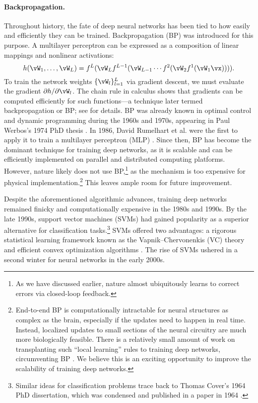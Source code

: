 \documentclass[../../book-main.tex]{subfiles}
\begin{document}
\paragraph{Backpropagation.}
Throughout history, the fate of deep neural networks has been tied to how easily and efficiently they can be trained. Backpropagation (BP) was introduced for this purpose. A multilayer perceptron can be expressed as a composition of linear mappings and nonlinear activations:
\begin{equation}
    h(\vW_{1}, \ldots, \vW_{L}) = f^{L}(\vW_{L}f^{L-1}(\vW_{L-1} \cdots f^{2}(\vW_{2}f^{1}(\vW_{1}\vx)))).
\end{equation}
To train the network weights \(\{\vW_{l}\}_{l=1}^{L}\) via gradient descent, we must evaluate the gradient \(\partial h/\partial \vW_{l}\). The chain rule in calculus shows that gradients can be computed efficiently for such functions---a technique later termed backpropagation or BP; see  for details. BP was already known in optimal control and dynamic programming during the 1960s and 1970s, appearing in Paul Werbos's 1974 PhD thesis \cite{Werbos-1974, Werbos1994TheRO}. In 1986, David Rumelhart et al. were the first to apply it to train a multilayer perceptron (MLP) \cite{Rumelhart1986}. Since then, BP has become the dominant technique for training deep networks, as it is scalable and can be efficiently implemented on parallel and distributed computing platforms. However, nature likely does not use BP,\footnote{As we have discussed earlier, nature almost ubiquitously learns to correct errors via closed-loop feedback.} as the mechanism is too expensive for physical implementation.\footnote{End-to-end BP is computationally intractable for neural structures as complex as the brain, especially if the updates need to happen in real time. Instead, localized updates to small sections of the neural circuitry are much more biologically feasible. There is a relatively small amount of work on transplanting such ``local learning'' rules to training deep networks, circumventing BP \cite{baldi2016theory,millidge2022predictive,li2025noprop}. We believe this is an exciting opportunity to improve the scalability of training deep networks.} This leaves ample room for future improvement.

Despite the aforementioned algorithmic advances, training deep networks remained finicky and computationally expensive in the 1980s and 1990s. By the late 1990s, support vector machines (SVMs) \cite{SVM-1995} had gained popularity as a superior alternative for classification tasks.\footnote{Similar ideas for classification problems trace back to Thomas Cover's 1964 PhD dissertation, which was condensed and published in a paper in 1964 \cite{Cover-1964}.} SVMs offered two advantages: a rigorous statistical learning framework known as the Vapnik--Chervonenkis (VC) theory and efficient convex optimization algorithms \cite{BoydVa04}. The rise of SVMs ushered in a second winter for neural networks in the early 2000s.
\end{document}
